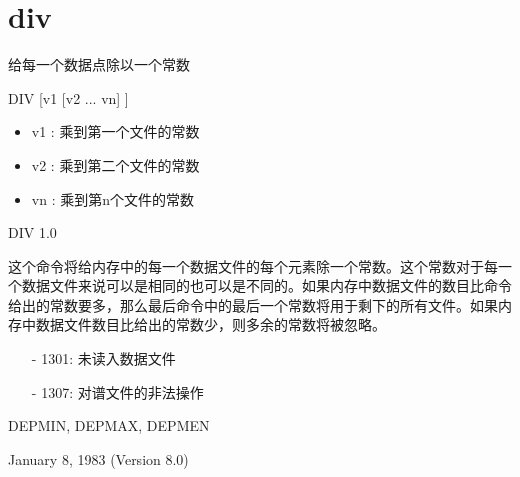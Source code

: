 \section{div}
\label{cmd:div}

给每一个数据点除以一个常数

DIV [v1 [v2 ... vn] ]

\begin{itemize}
\item v1 : 乘到第一个文件的常数
\item v2 : 乘到第二个文件的常数
\item vn : 乘到第n个文件的常数 
\end{itemize}

DIV 1.0

这个命令将给内存中的每一个数据文件的每个元素除一个常数。这个常数对于每一个数据文件来说可以是相同的也可以是不同的。如果内存中数据文件的数目比命令给出的常数要多，那么最后命令中的最后一个常数将用于剩下的所有文件。如果内存中数据文件数目比给出的常数少，则多余的常数将被忽略。

\begin{itemize}
\item[-]1301: 未读入数据文件
\item[-]1307: 对谱文件的非法操作
\end{itemize}

DEPMIN, DEPMAX, DEPMEN

January 8, 1983 (Version 8.0)
